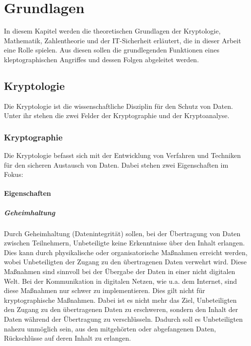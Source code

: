\chapter{Grundlagen}

In diesem Kapitel werden die theoretischen Grundlagen der Kryptologie, Mathematik, Zahlentheorie und der IT-Sicherheit erläutert, die in dieser Arbeit eine Rolle spielen. Aus diesen sollen die grundlegenden Funktionen eines kleptographischen Angriffes und dessen Folgen abgeleitet werden.

\section{Kryptologie}
    Die Kryptologie ist die wissenschaftliche Disziplin für den Schutz von Daten. Unter ihr stehen die zwei Felder der Kryptographie und der Kryptoanalyse.

    \subsection{Kryptographie}
        Die Kryptologie befasst sich mit der Entwicklung von Verfahren und Techniken für den sicheren Austausch von Daten. Dabei stehen zwei Eigenschaften \cite{BSW.2015} im Fokus:

        \subsubsection{Eigenschaften}
            \paragraph{Geheimhaltung}
                Durch Geheimhaltung (Datenintegrität) sollen, bei der Übertragung von Daten zwischen Teilnehmern, Unbeteiligte keine Erkenntnisse über den Inhalt erlangen. Dies kann durch physikalische oder organisatorische Maßnahmen erreicht werden, wobei Unbeteiligten der Zugang zu den übertragenen Daten verwehrt wird. Diese Maßnahmen sind sinnvoll bei der Übergabe der Daten in einer nicht digitalen Welt. Bei der Kommunikation in digitalen Netzen, wie u.a. dem Internet, sind diese Maßnahmen nur schwer zu implementieren. Dies gilt nicht für kryptographische Maßnahmen. Dabei ist es nicht mehr das Ziel, Unbeteiligten den Zugang zu den übertragenen Daten zu erschweren, sondern den Inhalt der Daten während der Übertragung zu verschlüsseln. Dadurch soll es Unbeteiligten nahezu unmöglich sein, aus den mitgehörten oder abgefangenen Daten, Rückschlüsse auf deren Inhalt zu erlangen.
                
